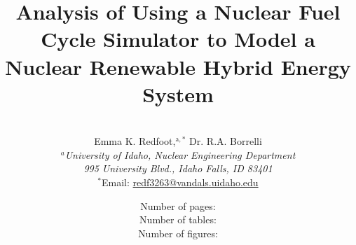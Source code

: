 \documentclass{article}                                                                           %
\begin{document}

\title{Analysis of Using a Nuclear Fuel Cycle Simulator to Model a Nuclear Renewable Hybrid Energy System} %

\author{
\vspace{20mm}
\\Emma K. Redfoot,$^{\text{a},\ast}$ Dr. R.A. Borrelli \\[4pt] %
\textit{$^a$University of Idaho, Nuclear Engineering Department}\\[-10pt]       %
\textit{995 University Blvd., Idaho Falls, ID 83401} \\[-5pt]
{$^\ast$Email: \href{mailto:redf3263@vandals.uidaho.edu}{redf3263@vandals.uidaho.edu}}}%

\date{                               %
\vspace{40mm}
Number of pages: \pageref*{LastPage} \\
Number of tables: \totaltables \\
Number of figures: \totalfigures
}

\clearpage\maketitle
\thispagestyle{empty}
\end{document}
